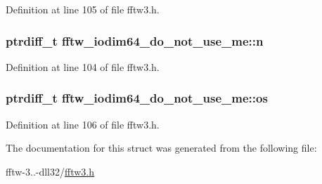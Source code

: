 Definition at line 105 of file fftw3.\-h.

\hypertarget{structfftw__iodim64__do__not__use__me_a19f8739d839b44db63c3aa1696a3a038}{
\subsubsection[{n}]{\setlength{\rightskip}{0pt plus 5cm}ptrdiff\-\_\-t fftw\-\_\-iodim64\-\_\-do\-\_\-not\-\_\-use\-\_\-me\-::n}}\label{structfftw__iodim64__do__not__use__me_a19f8739d839b44db63c3aa1696a3a038}


Definition at line 104 of file fftw3.\-h.

\hypertarget{structfftw__iodim64__do__not__use__me_a44118d774124bdaa670f640537b151cf}{
\subsubsection[{os}]{\setlength{\rightskip}{0pt plus 5cm}ptrdiff\-\_\-t fftw\-\_\-iodim64\-\_\-do\-\_\-not\-\_\-use\-\_\-me\-::os}}\label{structfftw__iodim64__do__not__use__me_a44118d774124bdaa670f640537b151cf}


Definition at line 106 of file fftw3.\-h.



The documentation for this struct was generated from the following file\-:\begin{DoxyCompactItemize}
\item 
fftw-\/3..-\/dll32/\hyperlink{fftw-3_82_82-dll32_2fftw3_8h}{fftw3.\-h}\end{DoxyCompactItemize}
